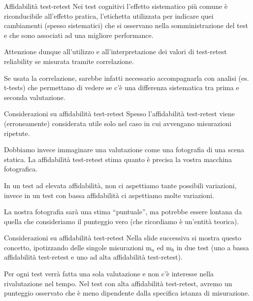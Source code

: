 \documentclass[
  ignorenonframetext,
  aspectratio=169,
]{beamer}
\begin{document}
\begin{frame}{Affidabilità test-retest}
\label{affidabilituxe0-test-retest-2}
Nei test cognitivi l'effetto sistematico più comune è riconducibile
all'effetto pratica, l'etichetta utilizzata per indicare quei
cambiamenti (spesso sistematici) che si osservano nella somministrazione
del test e che sono associati ad una migliore performance.

Attenzione dunque all'utilizzo e all'interpretazione dei valori di
test-retest reliability se misurata tramite correlazione.

Se usata la correlazione, sarebbe infatti necessario accompagnarla con
analisi (es. t-tests) che permettano di vedere se c'è una differenza
sistematica tra prima e seconda valutazione.
\end{frame}

\begin{frame}{Considerazioni su affidabilità test-retest}
\label{considerazioni-su-affidabilituxe0-test-retest}
Spesso l'affidabilità test-retest viene (erroneamente) considerata utile
solo nel caso in cui avvengano misurazioni ripetute.

Dobbiamo invece immaginare una valutazione come una fotografia di una
scena statica. La affidabilità test-retest stima quanto è precisa la
vostra macchina fotografica.

In un test ad elevata affidabilità, non ci aspettiamo tante possibili
variazioni, invece in un test con bassa affidabilità ci aspettiamo molte
variazioni.

La nostra fotografia sarà una stima ``puntuale'', ma potrebbe essere
lontana da quella che consideriamo il punteggio vero (che ricordiamo è
un'entità teorica).
\end{frame}

\begin{frame}{Considerazioni su affidabilità test-retest}
\label{considerazioni-su-affidabilituxe0-test-retest-1}
Nella slide successiva si mostra questo concetto, ipotizzando delle
singole misurazioni m\(_a\) ed m\(_b\) in due test (uno a bassa
affidabilità test-retest e uno ad alta affidabilità test-retest).

Per ogni test verrà fatta una sola valutazione e non c'è interesse nella
rivalutazione nel tempo. Nel test con alta affidabilità test-retest,
avremo un punteggio osservato che è meno dipendente dalla specifica
istanza di misurazione.
\end{frame}
\end{document}

